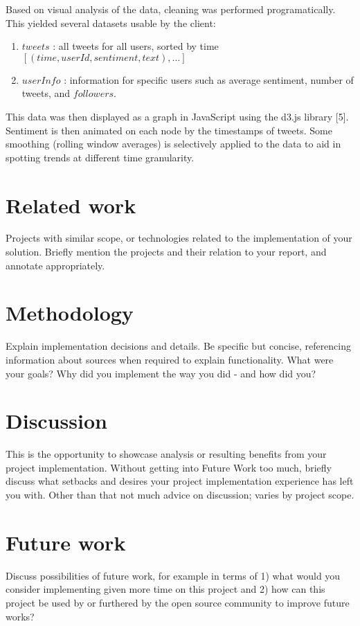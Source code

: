 \documentclass[12pt]{article}
\begin{document}
Based on visual analysis of the data, cleaning was performed programatically. This yielded several datasets usable by the client:
\begin{enumerate}
    \item $tweets$ : all tweets for all users, sorted by time $[(time, userId, sentiment, text), \dots]$
    \item $userInfo$ : information for specific users such as average sentiment, number of tweets, and $followers$.
\end{enumerate}

This data was then displayed as a graph in JavaScript using the d3.js library [5]. Sentiment is then animated on each node by the timestamps of tweets. Some smoothing (rolling window averages) is selectively applied to the data to aid in spotting trends at different time granularity.


\section{Related work}
Projects with similar scope, or technologies related to the implementation of your solution. Briefly mention the projects and their relation to your report, and annotate appropriately.

\section{Methodology}
Explain implementation decisions and details. Be specific but concise, referencing information about sources when required to explain functionality. What were your goals? Why did you implement the way you did - and how did you?

\section{Discussion}
This is the opportunity to showcase analysis or resulting benefits from your project implementation. Without getting into Future Work too much, briefly discuss what setbacks and desires your project implementation experience has left you with. Other than that not much advice on discussion; varies by project scope. 

\section{Future work}
Discuss possibilities of future work, for example in terms of 1) what would you consider implementing given more time on this project and 2) how can this project be used by or furthered by the open source community to improve future works?
\end{document}

